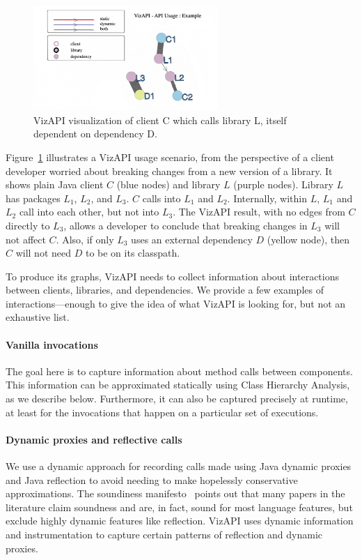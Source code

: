 \begin{figure}[h]
\begin{center}
\includegraphics[height=4cm,width=7cm]{images/intro-example.png}
\caption{VizAPI visualization of client C which calls library L, itself dependent on dependency D.}
\label{fig:example}
\end{center}
\end{figure}

Figure~\ref{fig:example} illustrates a VizAPI usage scenario, from the perspective of a client developer worried about breaking changes from a new version of a library. It shows plain Java client $C$ (blue nodes) and library $L$ (purple nodes). Library $L$ has packages $L_1$, $L_2$, and $L_3$. $C$ calls into $L_1$ and $L_2$. Internally, within $L$, $L_1$ and $L_2$ call into each other, but not into $L_3$. The VizAPI result, with no edges from $C$ directly to $L_3$, allows a developer to conclude that breaking changes in $L_3$ will not affect $C$. Also, if only $L_3$ uses an external dependency $D$ (yellow node), then $C$ will not need $D$ to be on its classpath.

To produce its graphs, VizAPI needs to collect information about interactions between clients, libraries, and dependencies. We provide a few examples of interactions---enough to give the idea of what VizAPI is looking for, but not an exhaustive list.

\paragraph{Vanilla invocations} The goal here is to capture information about method calls between components. This information can be approximated statically using Class Hierarchy Analysis, as we describe below. Furthermore, it can also be captured precisely at runtime, at least for the invocations that happen on a particular set of executions.

\paragraph{Dynamic proxies and reflective calls} We use a dynamic approach for recording calls made using Java dynamic proxies and Java reflection to avoid needing to make hopelessly conservative approximations. The soundiness manifesto~\cite{livshits15:_in_defen_sound} points out that many papers in the literature claim soundness and are, in fact, sound for most language features, but exclude highly dynamic features like reflection. VizAPI uses dynamic information and instrumentation to capture certain patterns of reflection and dynamic proxies.

